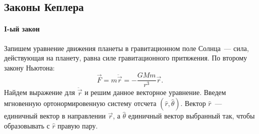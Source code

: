 \subsection{Законы Кеплера}

\paragraph{I-ый закон}
\label{sec:first-kepler-law} 

Запишем уравнение движения планеты в гравитационном поле Солнца~--- сила, действующая на планету, равна силе гравитационного притяжения. По второму закону Ньютона:
\begin{equation}
	\vec{F}=m\ddot{\vec{r}}=-\frac{GMm}{r^3}\vec{r}.
	\label{eq:kepler-laws-nsl}
\end{equation}
Найдем выражение для $\ddot{\vec{r}}$ и решим данное векторное уравнение. Введем мгновенную ортонормировенную систему отсчета $(\hat{r}, \hat{\theta})$. Вектор $\hat{r}$~--- единичный вектор в направлении $\vec{r}$, а $\hat{\theta}$ единичный вектор выбранный так, чтобы образовывать с $\hat{r}$ правую пару.

